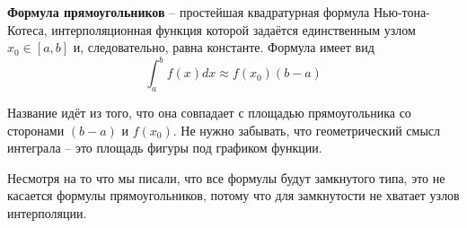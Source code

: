 \documentclass[../main.tex]{subfile}
\begin{document}
\begin{define}\label{eq:rectangle_formula}
	\textbf{Формула прямоугольников} -- простейшая квадратурная формула
	Нью-тона-Котеса, интерполяционная функция которой задаётся единственным
	узлом $x_0\in[a,b]$ и, следовательно, равна константе. Формула имеет вид
	\[\boxed{\int_{a}^{b}f(x)dx\approx f(x_0)(b-a)}\]
\end{define}

Название идёт из того, что она совпадает с площадью прямоугольника со сторонами
$(b-a)$ и $f(x_0)$. Не нужно забывать, что геометрический смысл интеграла -- это
площадь фигуры под графиком функции.

Несмотря на то что мы писали, что все формулы будут замкнутого типа, это не
касается формулы прямоугольников, потому что для замкнутости не хватает узлов
интерполяции.
\end{document}
